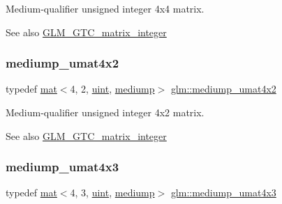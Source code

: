 Medium-\/qualifier unsigned integer 4x4 matrix. \begin{DoxySeeAlso}{See also}
\hyperlink{group__gtc__matrix__integer}{G\+L\+M\+\_\+\+G\+T\+C\+\_\+matrix\+\_\+integer} 
\end{DoxySeeAlso}
\mbox{\label{group__gtc__matrix__integer_gaf44e145efd637df6f2a300f968ebb51f}} 
\subsubsection{\texorpdfstring{mediump\+\_\+umat4x2}{mediump\_umat4x2}}
{\footnotesize\ttfamily typedef \hyperlink{structglm_1_1mat}{mat}$<$4, 2, \hyperlink{group__core__precision_ga4fd29415871152bfb5abd588334147c8}{uint}, \hyperlink{namespaceglm_a36ed105b07c7746804d7fdc7cc90ff25a6416f3ea0c9025fb21ed50c4d6620482}{mediump}$>$ \hyperlink{group__gtc__matrix__integer_gaf44e145efd637df6f2a300f968ebb51f}{glm\+::mediump\+\_\+umat4x2}}

Medium-\/qualifier unsigned integer 4x2 matrix. \begin{DoxySeeAlso}{See also}
\hyperlink{group__gtc__matrix__integer}{G\+L\+M\+\_\+\+G\+T\+C\+\_\+matrix\+\_\+integer} 
\end{DoxySeeAlso}
\mbox{\label{group__gtc__matrix__integer_ga974bc32af0686378c4696208c3103d96}} 
\subsubsection{\texorpdfstring{mediump\+\_\+umat4x3}{mediump\_umat4x3}}
{\footnotesize\ttfamily typedef \hyperlink{structglm_1_1mat}{mat}$<$4, 3, \hyperlink{group__core__precision_ga4fd29415871152bfb5abd588334147c8}{uint}, \hyperlink{namespaceglm_a36ed105b07c7746804d7fdc7cc90ff25a6416f3ea0c9025fb21ed50c4d6620482}{mediump}$>$ \hyperlink{group__gtc__matrix__integer_ga974bc32af0686378c4696208c3103d96}{glm\+::mediump\+\_\+umat4x3}}

